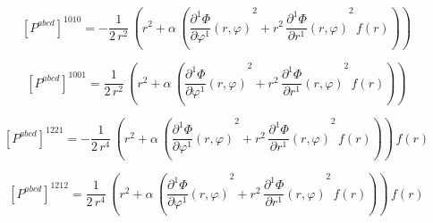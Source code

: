 \documentclass[11pt]{article}
\begin{document}
\par\smallskip
\begin{dmath*}[breakdepth={5}]
\left[P^{abcd}\right]^{1010} = -\frac{1}{2\,{r}^{2}}\,\left({r}^{2} + \alpha\,\left({\frac{\partial^{1} \Phi}{\partial \varphi^{1}}\!\left(r, \varphi\right)}^{2} + {r}^{2}\,{\frac{\partial^{1} \Phi}{\partial r^{1}}\!\left(r, \varphi\right)}^{2}\,f\!\left(r\right)\right)\right)
\end{dmath*}
\par\smallskip
\begin{dmath*}[breakdepth={5}]
\left[P^{abcd}\right]^{1001} = \frac{1}{2\,{r}^{2}}\,\left({r}^{2} + \alpha\,\left({\frac{\partial^{1} \Phi}{\partial \varphi^{1}}\!\left(r, \varphi\right)}^{2} + {r}^{2}\,{\frac{\partial^{1} \Phi}{\partial r^{1}}\!\left(r, \varphi\right)}^{2}\,f\!\left(r\right)\right)\right)
\end{dmath*}
\par\smallskip
\begin{dmath*}[breakdepth={5}]
\left[P^{abcd}\right]^{1221} = -\frac{1}{2\,{r}^{4}}\,\left({r}^{2} + \alpha\,\left({\frac{\partial^{1} \Phi}{\partial \varphi^{1}}\!\left(r, \varphi\right)}^{2} + {r}^{2}\,{\frac{\partial^{1} \Phi}{\partial r^{1}}\!\left(r, \varphi\right)}^{2}\,f\!\left(r\right)\right)\right)\,f\!\left(r\right)
\end{dmath*}
\par\smallskip
\begin{dmath*}[breakdepth={5}]
\left[P^{abcd}\right]^{1212} = \frac{1}{2\,{r}^{4}}\,\left({r}^{2} + \alpha\,\left({\frac{\partial^{1} \Phi}{\partial \varphi^{1}}\!\left(r, \varphi\right)}^{2} + {r}^{2}\,{\frac{\partial^{1} \Phi}{\partial r^{1}}\!\left(r, \varphi\right)}^{2}\,f\!\left(r\right)\right)\right)\,f\!\left(r\right)
\end{dmath*}
\par\smallskip
\end{document}
